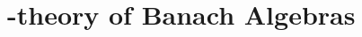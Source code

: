 \chapter[\texorpdfstring{\ensuremath{K}}{K}-theory of Banach Algebras]{\texorpdfstring{}{K}-theory of Banach Algebras}
\label{ch:k theory}







